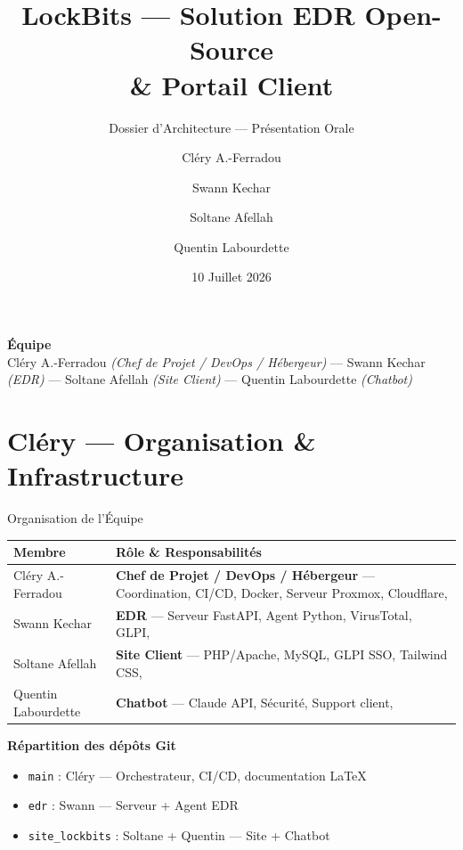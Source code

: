 \documentclass[xcolor=dvipsnames, aspectratio=169, 10pt]{beamer}
\title{\textbf{LockBits — Solution EDR Open-Source\\\& Portail Client}}
\subtitle{Dossier d'Architecture — Présentation Orale}
\author{Cléry A.-Ferradou \and Swann Kechar \and Soltane Afellah \and Quentin Labourdette}
\institute{ESGI — Projet Annuel 2\ieme{} année — 2025-2026}
\date{10 Juillet 2026}
\newcommand{\bitem}{\item[$\bullet$]}
\begin{document}
\begin{frame}
  \titlepage
  \vfill
  \centering
  \small\textbf{Équipe}\\[2pt]
  Cléry A.-Ferradou \textit{(Chef de Projet / DevOps / Hébergeur)} —
  Swann Kechar \textit{(EDR)} —
  Soltane Afellah \textit{(Site Client)} —
  Quentin Labourdette \textit{(Chatbot)}
\end{frame}

\section{Cléry — Organisation \& Infrastructure}

\begin{frame}{Organisation de l'Équipe}
  \centering
  \begin{tabularx}{\textwidth}{@{}l X@{}}
    \toprule
    \textbf{Membre} & \textbf{Rôle \& Responsabilités} \\
    \midrule
    Cléry A.-Ferradou &
    \textbf{Chef de Projet / DevOps / Hébergeur} —
    Coordination, CI/CD, Docker, Serveur Proxmox, Cloudflare, \\
    Swann Kechar &
    \textbf{EDR} — Serveur FastAPI, Agent Python, VirusTotal, GLPI, \\
    Soltane Afellah &
    \textbf{Site Client} — PHP/Apache, MySQL, GLPI SSO, Tailwind CSS, \\
    Quentin Labourdette &
    \textbf{Chatbot} — Claude API, Sécurité, Support client, \\
    \bottomrule
  \end{tabularx}
  \vspace{0.3cm}
  \textbf{Répartition des dépôts Git}
  \begin{itemize}
    \bitem \texttt{main} : Cléry — Orchestrateur, CI/CD, documentation LaTeX
    \bitem \texttt{edr} : Swann — Serveur + Agent EDR
    \bitem \texttt{site\_lockbits} : Soltane + Quentin — Site + Chatbot
  \end{itemize}
\end{frame}
\end{document}
